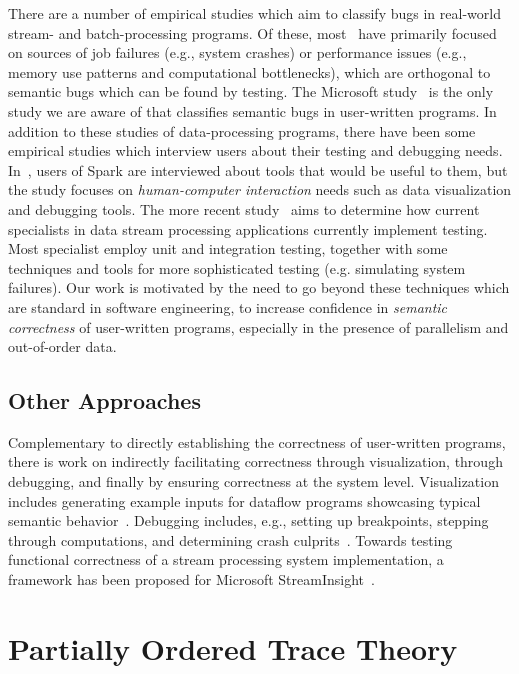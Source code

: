 There are a number of empirical studies which aim to classify bugs in real-world stream- and batch-processing programs. Of these, most~\cite{schroeder2009large, kavulya2010analysis, li2013characteristic, zhou2015empirical} have primarily focused on sources of job failures (e.g., system crashes) or performance issues (e.g., memory use patterns and computational bottlenecks), which are orthogonal to semantic bugs which can be found by testing. The Microsoft study~\cite{xiao2014nondeterminism} is the only study we are aware of that classifies semantic bugs in user-written programs.
In addition to these studies of data-processing programs, there have been some empirical studies which interview users about their testing and debugging needs. In~\cite{fisher2012interactions}, users of Spark are interviewed about tools that would be useful to them, but the study focuses on \emph{human-computer interaction} needs such as data visualization and debugging tools. The more recent study~\cite{vianna2019exploratory} aims to determine how current specialists in data stream processing applications currently implement testing. Most specialist employ unit and integration testing, together with some techniques and tools for more sophisticated testing (e.g. simulating system failures). Our work is motivated by the need to go beyond these techniques which are standard in software engineering, to increase confidence in \emph{semantic correctness} of user-written programs, especially in the presence of parallelism and out-of-order data.

\subsection{Other Approaches}

Complementary to directly establishing the correctness of user-written programs, there is work on indirectly facilitating correctness through visualization, through debugging, and finally by ensuring correctness at the system level.
Visualization includes generating example inputs for dataflow programs showcasing typical semantic behavior~\cite{olston2009generating}. Debugging includes, e.g., setting up breakpoints, stepping through computations, and determining crash culprits~\cite{gulzar2016bigdebug,olston2011inspector}.
Towards testing functional correctness of a stream processing system implementation, a framework has been proposed for Microsoft StreamInsight~\cite{raizman2010extensible}.

\section{Partially Ordered Trace Theory}

